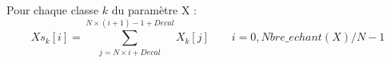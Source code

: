 Pour chaque classe $k$ du param\`etre X : \\
\[
Xs_k[i] = \sum_{j=N\times i+Decal}^{N\times (i+1) -1 + Decal } X_k[j]
 \qquad i=0, Nbre\_echant(X)/N - 1
\]
